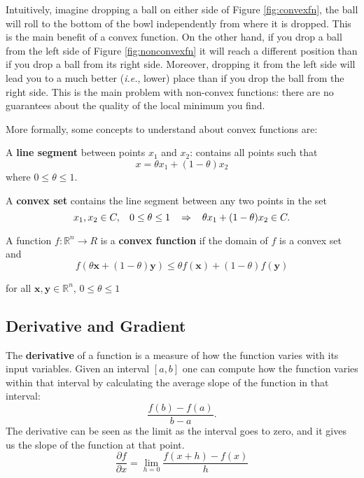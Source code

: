 Intuitively, imagine dropping a ball on either side of Figure \ref{fig:convexfn}, the ball will roll to the bottom of the bowl independently from where it is dropped. This is the main benefit of a convex function. On the other hand, if you drop a ball from the left side of Figure \ref{fig:nonconvexfn} it will reach a different position than if you drop a ball from its right side. Moreover, dropping it from the left side will lead you to a much better (\emph{i.e.}, lower) place than if you drop the ball from the right side. This is the main problem with non-convex functions: there are no guarantees about the quality of the local minimum you find.

More formally, some concepts to understand about convex functions are:

\noindent A {\bf line segment} between points $x_{1}$ and $x_{2}$: contains all points such that 
\begin{equation*}
x=\theta x_{1} + (1-\theta)x_{2}
\end{equation*}
where $0\leq \theta \leq 1$.

\vspace{0.1in}
\noindent A {\bf convex set} contains the line segment between any two points in the set 
\begin{equation*}
x_{1}, x_{2} \in C,\hspace{0.12in} 0 \leq \theta \leq 1 \hspace{0.12in} \Rightarrow \hspace{0.12in} \theta x_{1} + (1-\theta)x_{2} \in C.
\end{equation*}

\vspace{0.1in}
\noindent A function $f: \mathbb{R}^{n}\rightarrow R$ is a {\bf convex function} if the domain of $f$ is a convex set and 
\begin{equation*}
f(\theta \textbf{x} + (1-\theta) \textbf{y}) \leq \theta f(\textbf{x}) + (1-\theta) f(\textbf{y})
\end{equation*}

\noindent for all $\textbf{x},\textbf{y} \in \mathbb{R}^{n}$, $0 \leq \theta \leq 1$

\subsection{Derivative and Gradient}

The \textbf{derivative} of a function is a measure of how the function varies with its input variables. Given an interval $[a,b]$ one can compute how the function varies within that interval by calculating the average slope of the function in that interval: 
\begin{equation}
\frac{f(b) - f(a)}{b-a}.
\end{equation}
The derivative can be seen as the limit as the interval goes to zero, and it gives us the slope of the function at that point.
\begin{equation}
\frac {\partial f}{\partial x} = \lim_{h = 0} \frac{f(x+h) - f(x)}{h} 
\end{equation}

